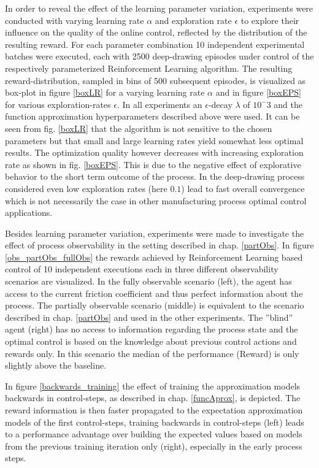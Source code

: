 In order to reveal the effect of the learning parameter variation, experiments were conducted with varying learning rate $\alpha$ and exploration rate $\epsilon$ to explore their influence on the quality of the online control, reflected by the distribution of the resulting reward. For each parameter combination 10 independent experimental batches were executed, each with 2500 deep-drawing episodes under control of the respectively parameterized Reinforcement Learning algorithm. The resulting reward-distribution, sampled in bins of 500 subsequent episodes, is visualized as box-plot in figure \ref{boxLR} for a varying learning rate $\alpha$ and in figure \ref{boxEPS} for various exploration-rates $\epsilon$. In all experiments an $\epsilon$-decay $\lambda$ of $10^-3$ and the function approximation hyperparameters described above were used. It can be seen from fig. \ref{boxLR} that the algorithm is not sensitive to the chosen parameters but that small and large learning rates yield somewhat less optimal results. The optimization quality however decreases with increasing exploration rate as shown in fig. \ref{boxEPS}. This is due to the negative effect of explorative behavior to the short term outcome of the process. In the deep-drawing process considered even low exploration rates (here $0.1$) lead to fast overall convergence which is not necessarily the case in other manufacturing process optimal control applications. 


Besides learning parameter variation, experiments were made to investigate the effect of process observability in the setting described in chap. \ref{partObs}. In figure \ref{obs_partObs_fullObs} the rewards achieved by Reinforcement Learning based control of 10 independent executions each in three different observability scenarios are visualized. In the fully observable scenario (left), the agent has access to the current friction coefficient and thus perfect information about the process. The partially observable scenario (middle) is equivalent to the scenario described in chap. \ref{partObs} and used in the other experiments. The ''blind'' agent (right) has no access to information regarding the process state and the optimal control is based on the knowledge about previous control actions and rewards only. In this scenario the median of the performance (Reward) is only slightly above the baseline. 


In figure \ref{backwards_training} the effect of training the approximation models backwards in control-steps, as described in chap. \ref{funcAprox}, is depicted. The reward information is then faster propagated to the expectation approximation models of the first control-steps, training backwards in control-steps (left) leads to a performance advantage over building the expected values based on models from the previous training iteration only (right), especially in the early process steps.



